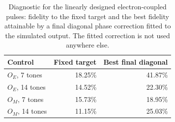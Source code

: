 \begin{table}[htbp]
\centering
\small
\setlength{\tabcolsep}{4pt}
\caption{Diagnostic for the linearly designed electron-coupled pulses: fidelity to the fixed target and the best fidelity attainable by a final diagonal phase correction fitted to the simulated output. The fitted correction is not used anywhere else.}\label{tab:diag}
\begin{tabular}{lrr}
\toprule
Control & Fixed target & Best final diagonal \\
\midrule
$O_E$, 7 tones & 18.25\% & 41.87\% \\
$O_E$, 14 tones & 14.52\% & 22.30\% \\
$O_M$, 7 tones & 15.73\% & 18.95\% \\
$O_M$, 14 tones & 11.15\% & 25.03\% \\
\bottomrule
\end{tabular}
\end{table}

